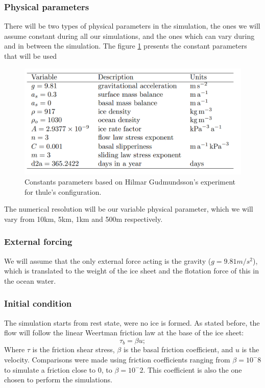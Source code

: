 \documentclass[a4paper,12pt]{article}
\begin{document}
\subsubsection{Physical parameters}
There will be two types of physical parameters in the simulation, the ones we will assume constant during all our simulations, and the ones which can vary during and in between the simulation. The figure \ref{Constants_parameters} presents the constant parameters that will be used
\begin{figure}[!h]
	\centering
	\includegraphics[width=0.7\linewidth]{../fig/Constants_parameters}
	\caption{Constants parameters based on Hilmar Gudmundsson's experiment for thule's configuration.}
	\label{Constants_parameters}
\end{figure}
The numerical resolution will be our variable physical parameter, which we will vary from 10km, 5km, 1km and 500m respectively. 
\subsubsection{External forcing}
We will assume that the only external force acting is the gravity ($g=9.81 m/s^2$), which is translated to the weight of the ice sheet and the flotation force of this in the ocean water.
\subsubsection{Initial condition}
The simulation starts from rest state, were no ice is formed. 
As stated before, the flow will follow the linear Weertman friction law at the base of the ice sheet:
\begin{equation}
	\tau_b=\beta u;
\end{equation}
Where $\tau$ is the friction shear stress, $\beta$ is the basal friction coefficient, and $u$ is the velocity.
Comparisons were made using friction coefficients ranging from $\beta=10^-8$ to simulate a friction close to 0, to $\beta=10^-2$. This coefficient is also the one chosen to perform the simulations. 
\end{document}
